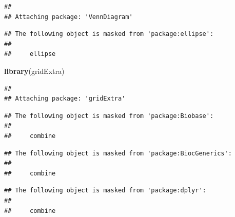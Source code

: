 \documentclass[
]{article}
\newenvironment{Shaded}{\begin{snugshade}}{\end{snugshade}}
\newcommand{\FunctionTok}[1]{\textcolor[rgb]{0.13,0.29,0.53}{\textbf{#1}}}
\newcommand{\NormalTok}[1]{#1}
\begin{document}
\begin{verbatim}
## 
## Attaching package: 'VennDiagram'
\end{verbatim}

\begin{verbatim}
## The following object is masked from 'package:ellipse':
## 
##     ellipse
\end{verbatim}

\begin{Shaded}
\begin{Highlighting}[]
\FunctionTok{library}\NormalTok{(gridExtra)}
\end{Highlighting}
\end{Shaded}

\begin{verbatim}
## 
## Attaching package: 'gridExtra'
\end{verbatim}

\begin{verbatim}
## The following object is masked from 'package:Biobase':
## 
##     combine
\end{verbatim}

\begin{verbatim}
## The following object is masked from 'package:BiocGenerics':
## 
##     combine
\end{verbatim}

\begin{verbatim}
## The following object is masked from 'package:dplyr':
## 
##     combine
\end{verbatim}
\end{document}
